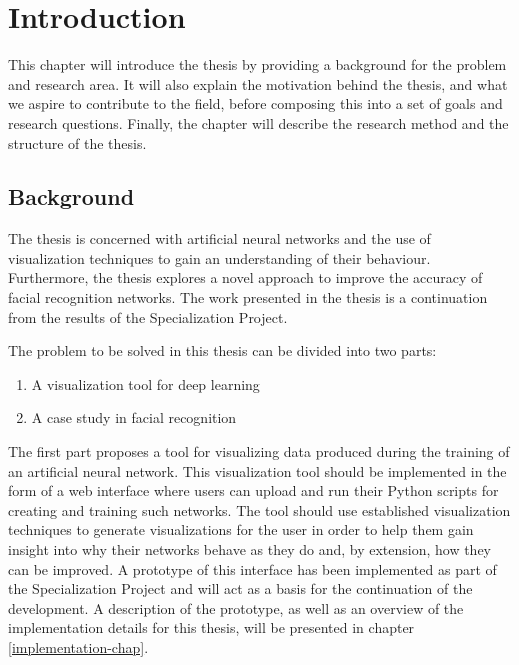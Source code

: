 \chapter{Introduction}

This chapter will introduce the thesis by providing a background for the problem and research area. It will also explain the motivation behind the thesis, and what we aspire to contribute to the field, before composing this into a set of goals and research questions. Finally, the chapter will describe the research method and the structure of the thesis.

\section{Background}

\noindent The thesis is concerned with artificial neural networks and the use of visualization techniques to gain an understanding of their behaviour. Furthermore, the thesis explores a novel approach to improve the accuracy of facial recognition networks. The work presented in the thesis is a continuation from the results of the Specialization Project.

\noindent The problem to be solved in this thesis can be divided into two parts:
\begin{enumerate}
    \item A visualization tool for deep learning
    \item A case study in facial recognition
\end{enumerate}

\noindent The first part proposes a tool for visualizing data produced during the training of an artificial neural network. This visualization tool should be implemented in the form of a web interface where users can upload and run their Python scripts for creating and training such networks. The tool should use established visualization techniques to generate visualizations for the user in order to help them gain insight into why their networks behave as they do and, by extension, how they can be improved. A prototype of this interface has been implemented as part of the Specialization Project and will act as a basis for the continuation of the development. A description of the prototype, as well as an overview of the implementation details for this thesis, will be presented in chapter \ref{implementation-chap}. \\

